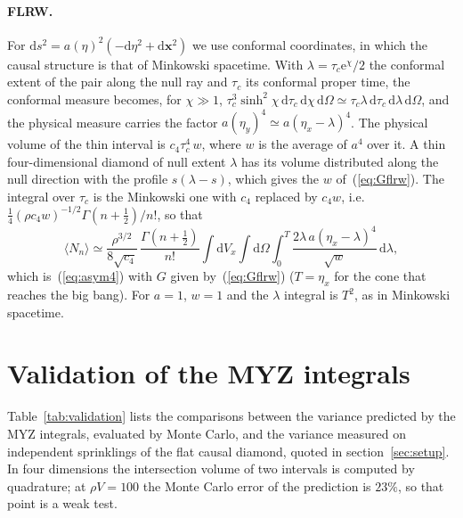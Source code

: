 \documentclass{iopjournal}
\newcommand{\eref}[1]{(\ref{#1})}
\newcommand{\Tref}[1]{Table~\ref{#1}}
\newcommand{\rmd}{\mathrm{d}}
\newcommand{\rme}{\mathrm{e}}
\newcommand{\rhoV}{\rho V}
\begin{document}
\paragraph{FLRW.} For $\rmd s^2=a(\eta)^2(-\rmd\eta^2+\rmd\boldsymbol x^2)$
we use conformal coordinates, in which the causal structure is that of
Minkowski spacetime. With $\lambda=\tau_c\rme^\chi/2$ the conformal extent of
the pair along the null ray and $\tau_c$ its conformal proper time, the
conformal measure becomes, for $\chi\gg1$,
$\tau_c^3\sinh^2\chi\,\rmd\tau_c\,\rmd\chi\,\rmd\Omega\simeq
\tau_c\lambda\,\rmd\tau_c\,\rmd\lambda\,\rmd\Omega$, and the physical measure
carries the factor $a(\eta_y)^4\simeq a(\eta_x-\lambda)^4$. The physical
volume of the thin interval is $c_4\tau_c^4\,w$, where $w$ is the average of
$a^4$ over it. A thin four-dimensional diamond of null extent $\lambda$ has
its volume distributed along the null direction with the profile
$s(\lambda-s)$, which gives the $w$ of~\eref{eq:Gflrw}. The integral over
$\tau_c$ is the Minkowski one with $c_4$ replaced by $c_4w$, i.e.\
$\frac14(\rho c_4w)^{-1/2}\Gamma(n+\frac12)/n!$, so that
\begin{equation}
\langle N_n\rangle\simeq\frac{\rho^{3/2}}{8\sqrt{c_4}}\,
\frac{\Gamma(n+\frac12)}{n!}\int\rmd V_x\int\rmd\Omega\int_0^{T}
\frac{2\lambda\,a(\eta_x-\lambda)^4}{\sqrt w}\,\rmd\lambda,
\end{equation}
which is~\eref{eq:asym4} with $G$ given by~\eref{eq:Gflrw} ($T=\eta_x$
for the cone that reaches the big bang). For $a=1$, $w=1$ and the
$\lambda$ integral is $T^2$, as in Minkowski spacetime.

\section{Validation of the MYZ integrals}
\label{app:validation}

\Tref{tab:validation} lists the comparisons between the variance predicted by
the MYZ integrals, evaluated by Monte Carlo, and the variance measured on
independent sprinklings of the flat causal diamond, quoted in
section~\ref{sec:setup}. In four dimensions the intersection volume of two
intervals is computed by quadrature; at $\rhoV=100$ the Monte Carlo error of
the prediction is $23\%$, so that point is a weak test.
\end{document}
